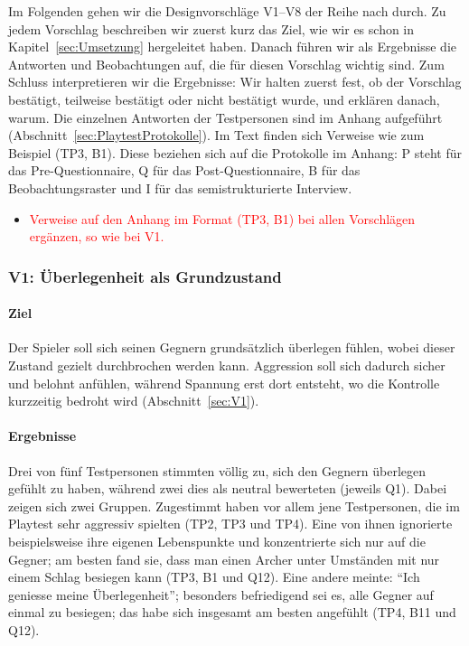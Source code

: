 \documentclass[../Main.tex]{subfiles}
\begin{document}
Im Folgenden gehen wir die Designvorschläge V1--V8 der Reihe nach durch. Zu jedem Vorschlag beschreiben wir zuerst kurz das Ziel, wie wir es schon in Kapitel~\ref{sec:Umsetzung} hergeleitet haben. Danach führen wir als Ergebnisse die Antworten und Beobachtungen auf, die für diesen Vorschlag wichtig sind. Zum Schluss interpretieren wir die Ergebnisse: Wir halten zuerst fest, ob der Vorschlag bestätigt, teilweise bestätigt oder nicht bestätigt wurde, und erklären danach, warum. Die einzelnen Antworten der Testpersonen sind im Anhang aufgeführt (Abschnitt~\ref{sec:PlaytestProtokolle}). Im Text finden sich Verweise wie zum Beispiel (TP3, B1). Diese beziehen sich auf die Protokolle im Anhang: P steht für das Pre-Questionnaire, Q für das Post-Questionnaire, B für das Beobachtungsraster und I für das semistrukturierte Interview.

\begin{itemize}[leftmargin=1.5cm]
    \item \textcolor{red}{Verweise auf den Anhang im Format (TP3, B1) bei allen Vorschlägen ergänzen, so wie bei V1.}
\end{itemize}

\subsubsection{V1: Überlegenheit als Grundzustand}

\paragraph{Ziel}
Der Spieler soll sich seinen Gegnern grundsätzlich überlegen fühlen, wobei dieser Zustand gezielt durchbrochen werden kann. Aggression soll sich dadurch sicher und belohnt anfühlen, während Spannung erst dort entsteht, wo die Kontrolle kurzzeitig bedroht wird (Abschnitt~\ref{sec:V1}).

\paragraph{Ergebnisse}
Drei von fünf Testpersonen stimmten völlig zu, sich den Gegnern überlegen gefühlt zu haben, während zwei dies als neutral bewerteten (jeweils Q1). Dabei zeigen sich zwei Gruppen. Zugestimmt haben vor allem jene Testpersonen, die im Playtest sehr aggressiv spielten (TP2, TP3 und TP4). Eine von ihnen ignorierte beispielsweise ihre eigenen Lebenspunkte und konzentrierte sich nur auf die Gegner; am besten fand sie, dass man einen Archer unter Umständen mit nur einem Schlag besiegen kann (TP3, B1 und Q12). Eine andere meinte: \enquote{Ich geniesse meine Überlegenheit}; besonders befriedigend sei es, alle Gegner auf einmal zu besiegen; das habe sich insgesamt am besten angefühlt (TP4, B11 und Q12).
\end{document}
